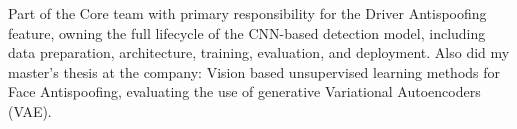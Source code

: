 Part of the Core team with primary responsibility for the Driver Antispoofing feature, owning the full lifecycle of the CNN-based detection model, including data preparation, architecture, training, evaluation, and deployment.
Also did my master's thesis at the company: Vision based unsupervised learning methods for Face Antispoofing, evaluating the use of generative Variational Autoencoders (VAE).